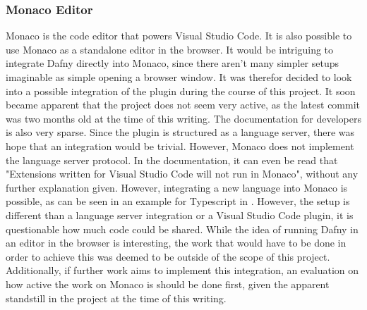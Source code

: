 \subsubsection{Monaco Editor}
Monaco\cite{monaco} is the code editor that powers Visual Studio Code. It is also possible to use Monaco as a standalone editor in the browser. It would be intriguing to integrate Dafny directly into Monaco, since there aren't many simpler setups imaginable as simple opening a browser window. It was therefor decided to look into a possible integration of the plugin during the course of this project. \newline
 It soon became apparent that the project does not seem very active, as the latest commit was two months old at the time of this writing. The documentation for developers is also very sparse. Since the plugin is structured as a language server, there was hope that an integration would be trivial. However, Monaco does not implement the language server protocol. In the documentation, it can even be read that "Extensions written for Visual Studio Code will not run in Monaco"\cite{monaco}, without any further explanation given. \newline
 However, integrating a new language into Monaco is possible, as can be seen in an example for Typescript in  \cite{monacoType}. However, the setup is different than a language server integration or a Visual Studio Code plugin, it is questionable how much code could be shared. While the idea of running Dafny in an editor in the browser is interesting, the work that would have to be done in order to achieve this was deemed to be outside of the scope of this project. Additionally, if further work aims to implement this integration, an evaluation on how active the work on Monaco is should be done first, given the apparent standstill in the project at the time of this writing.\newline